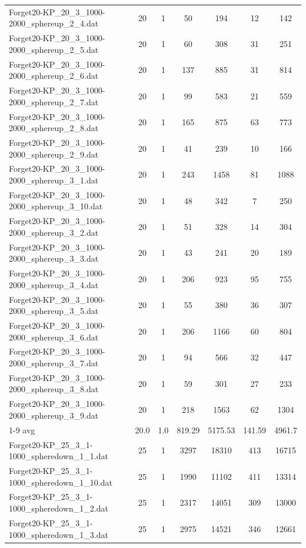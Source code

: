 \begin{table}[!ht]
\begin{tabular}{lcccccc}
Forget20-KP\_20\_3\_1000-2000\_sphereup\_2\_4.dat & 20 & 1 & 50 & 194 & 12 & 142 \\
Forget20-KP\_20\_3\_1000-2000\_sphereup\_2\_5.dat & 20 & 1 & 60 & 308 & 31 & 251 \\
Forget20-KP\_20\_3\_1000-2000\_sphereup\_2\_6.dat & 20 & 1 & 137 & 885 & 31 & 814 \\
Forget20-KP\_20\_3\_1000-2000\_sphereup\_2\_7.dat & 20 & 1 & 99 & 583 & 21 & 559 \\
Forget20-KP\_20\_3\_1000-2000\_sphereup\_2\_8.dat & 20 & 1 & 165 & 875 & 63 & 773 \\
Forget20-KP\_20\_3\_1000-2000\_sphereup\_2\_9.dat & 20 & 1 & 41 & 239 & 10 & 166 \\
Forget20-KP\_20\_3\_1000-2000\_sphereup\_3\_1.dat & 20 & 1 & 243 & 1458 & 81 & 1088 \\
Forget20-KP\_20\_3\_1000-2000\_sphereup\_3\_10.dat & 20 & 1 & 48 & 342 & 7 & 250 \\
Forget20-KP\_20\_3\_1000-2000\_sphereup\_3\_2.dat & 20 & 1 & 51 & 328 & 14 & 304 \\
Forget20-KP\_20\_3\_1000-2000\_sphereup\_3\_3.dat & 20 & 1 & 43 & 241 & 20 & 189 \\
Forget20-KP\_20\_3\_1000-2000\_sphereup\_3\_4.dat & 20 & 1 & 206 & 923 & 95 & 755 \\
Forget20-KP\_20\_3\_1000-2000\_sphereup\_3\_5.dat & 20 & 1 & 55 & 380 & 36 & 307 \\
Forget20-KP\_20\_3\_1000-2000\_sphereup\_3\_6.dat & 20 & 1 & 206 & 1166 & 60 & 804 \\
Forget20-KP\_20\_3\_1000-2000\_sphereup\_3\_7.dat & 20 & 1 & 94 & 566 & 32 & 447 \\
Forget20-KP\_20\_3\_1000-2000\_sphereup\_3\_8.dat & 20 & 1 & 59 & 301 & 27 & 233 \\
Forget20-KP\_20\_3\_1000-2000\_sphereup\_3\_9.dat & 20 & 1 & 218 & 1563 & 62 & 1304 \\
\cline{1-9} avg & 20.0 & 1.0 & 819.29& 5175.53 & 141.59& 4961.7\\ \hline
Forget20-KP\_25\_3\_1-1000\_spheredown\_1\_1.dat & 25 & 1 & 3297 & 18310 & 413 & 16715 \\
Forget20-KP\_25\_3\_1-1000\_spheredown\_1\_10.dat & 25 & 1 & 1990 & 11102 & 411 & 13314 \\
Forget20-KP\_25\_3\_1-1000\_spheredown\_1\_2.dat & 25 & 1 & 2317 & 14051 & 309 & 13000 \\
Forget20-KP\_25\_3\_1-1000\_spheredown\_1\_3.dat & 25 & 1 & 2975 & 14521 & 346 & 12661 \\

\end{tabular}
\end{table}
